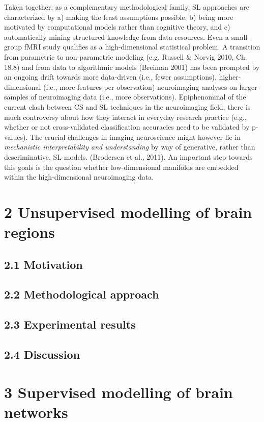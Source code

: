 \documentclass[authoryear,review,3p]{elsarticle}
\begin{document}
Taken together,
as a complementary methodological family,
SL approaches are characterized by
a) making the least assumptions possible,
b) being more motivated by computational models rather than cognitive theory,
and c) automatically mining structured knowledge from data resources.
Even a
small-group fMRI study qualifies as a high-dimensional statistical problem.
A transition from parametric to non-parametric modeling
(e.g. Russell \& Norvig 2010, Ch. 18.8)
and
from data to algorithmic models (Breiman 2001)
has been prompted by an ongoing
drift towards more data-driven (i.e., fewer assumptions),
higher-dimensional (i.e., more features per observation) neuroimaging analyses
on larger samples of neuroimaging data (i.e., more observations).
%
Epiphenominal of the current clash between
CS and SL techniques in the neuroimaging field,
there is much
controversy about how they interact in everyday research practice
(e.g., whether or not cross-validated classification accuracies need to be
validated by p-values).
%
The crucial challenges in imaging neuroscience
might however lie in
\textit{mechanistic interpretability and understanding}
by way of generative, rather than descriminative, SL models.
(Brodersen et al., 2011).
An important step towards this goals is the question
whether
low-dimensional manifolds are
embedded within the high-dimensional neuroimaging data.



\section*{2 Unsupervised modelling of brain regions}

\subsection*{2.1 Motivation}
\subsection*{2.2 Methodological approach}
\subsection*{2.3 Experimental results}
\subsection*{2.4 Discussion}


\bigskip
\section*{3 Supervised modelling of brain networks}
\end{document}
